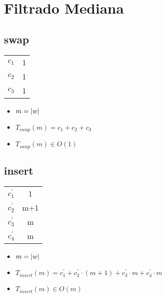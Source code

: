 \documentclass{article}
\begin{document}
    \section*{Filtrado Mediana}

    \subsection*{swap}

    \begin{minipage}{0.70\textwidth}
        
    \end{minipage}
    \hfill
    \begin{minipage}{0.25\textwidth}
        \begin{tabular}{|c|c}
            $c_1$ & 1 \\
            $c_2$ & 1 \\
            $c_3$ & 1 \\
        \end{tabular}
    \end{minipage}

    \begin{itemize}
        \item $m = |w|$
        \item $T_{swap}(m) = c_1 + c_2 + c_3 $
        \item $T_{swap}(m) \in O(1)$
    \end{itemize}

    \subsection*{insert}

    \begin{minipage}{0.70\textwidth}
        
    \end{minipage}
    \hfill
    \begin{minipage}{0.25\textwidth}
        \begin{tabular}{|c|c}
            $c^{\prime}_1$ & 1 \\
            $c^{\prime}_2$ & m+1 \\
            $c^{\prime}_3$ & m \\
            $c^{\prime}_4$ & m \\
        \end{tabular}
    \end{minipage}

    \begin{itemize}
        \item $m = |w|$
        \item $T_{insert}(m) = c^{\prime}_1 +
                               c^{\prime}_2 \cdot (m+1) +
                               c^{\prime}_3 \cdot m +
                               c^{\prime}_4 \cdot m $
        \item $T_{insert}(m) \in O(m)$
    \end{itemize}
\end{document}
